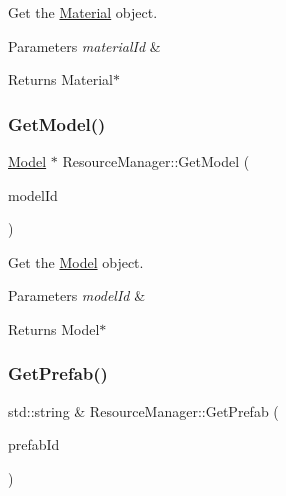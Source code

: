 Get the \hyperlink{classMaterial}{Material} object. 


\begin{DoxyParams}{Parameters}
{\em material\+Id} & \\
\hline
\end{DoxyParams}
\begin{DoxyReturn}{Returns}
Material$\ast$ 
\end{DoxyReturn}
\mbox{\label{classResourceManager_a5355a5eb681e10b80dff36113ad9749a}} 
\subsubsection{\texorpdfstring{Get\+Model()}{GetModel()}}
{\footnotesize\ttfamily \hyperlink{classModel}{Model} $\ast$ Resource\+Manager\+::\+Get\+Model (\begin{DoxyParamCaption}\item[{\hyperlink{classStringId}{String\+Id}}]{model\+Id }\end{DoxyParamCaption})}



Get the \hyperlink{classModel}{Model} object. 


\begin{DoxyParams}{Parameters}
{\em model\+Id} & \\
\hline
\end{DoxyParams}
\begin{DoxyReturn}{Returns}
Model$\ast$ 
\end{DoxyReturn}
\mbox{\label{classResourceManager_aade11c5b0af3ecac56f4629c9f07683d}} 
\subsubsection{\texorpdfstring{Get\+Prefab()}{GetPrefab()}}
{\footnotesize\ttfamily std\+::string \& Resource\+Manager\+::\+Get\+Prefab (\begin{DoxyParamCaption}\item[{\hyperlink{classStringId}{String\+Id}}]{prefab\+Id }\end{DoxyParamCaption})}



